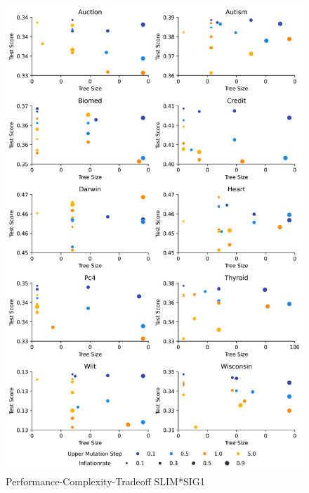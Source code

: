 
    \begin{figure}[H]
    \centering
    \includegraphics[width=\linewidth]{../Latex/Chapters/Figures/Results/inflationrate_test_performance_complexity_tradeoff_mulsig1.png}
    \caption{Performance-Complexity-Tradeoff SLIM*SIG1}
    \label{fig:inflationrate_test_performance_complexity_tradeoff_mulsig1}
    \end{figure}
    